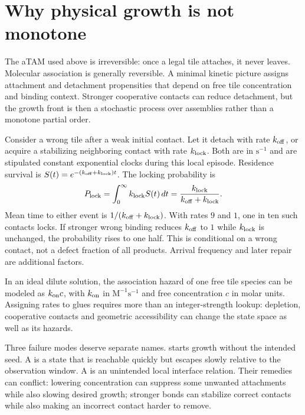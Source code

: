 \section{Why physical growth is not monotone}

The aTAM used above is irreversible: once a legal tile attaches, it never leaves.
Molecular association is generally reversible. A minimal kinetic picture assigns
attachment and detachment propensities that depend on free tile concentration
and binding context. Stronger cooperative contacts can reduce detachment, but
the growth front is then a stochastic process over assemblies rather than a
monotone partial order.

Consider a wrong tile after a weak initial contact. Let it detach with rate
$k_{\rm off}$, or acquire a stabilizing neighboring contact with rate
$k_{\rm lock}$. Both are in $\mathrm{s}^{-1}$ and are stipulated constant
exponential clocks during this local episode. Residence survival is
$S(t)=e^{-(k_{\rm off}+k_{\rm lock})t}$. The locking probability is
\begin{equation}
 P_{\rm lock}=\int_0^\infty k_{\rm lock}S(t)\,dt
 =\frac{k_{\rm lock}}{k_{\rm off}+k_{\rm lock}}.
 \label{dnad22:trap}
\end{equation}
Mean time to either event is $1/(k_{\rm off}+k_{\rm lock})$. With rates
$9$ and $1$, one in ten such contacts locks. If stronger wrong binding
reduces $k_{\rm off}$ to $1$ while $k_{\rm lock}$ is unchanged, the probability
rises to one half. This is conditional on a wrong contact, not a defect
fraction of all products. Arrival frequency and later repair are additional factors.


In an ideal dilute solution, the association hazard of one free tile species
can be modeled as $k_{\rm on}c$, with $k_{\rm on}$ in
$\mathrm{M}^{-1}\mathrm{s}^{-1}$ and free concentration $c$ in molar units.
Assigning rates to glues requires more than an integer-strength lookup:
depletion, cooperative contacts and geometric accessibility can change the
state space as well as its hazards.


Three failure modes deserve separate names.  starts
growth without the intended seed. A  is a state that is
reachable quickly but escapes slowly relative to the observation window.
A  is an unintended local interface relation. Their remedies can
conflict: lowering concentration can suppress some unwanted attachments while
also slowing desired growth; stronger bonds can stabilize correct contacts while
also making an incorrect contact harder to remove.

